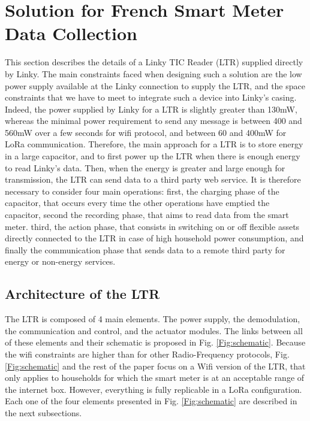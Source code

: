 \documentclass[conference]{IEEEtran}
\begin{document}
\section{Solution for French Smart Meter Data Collection}
\label{section:solution}
This section describes the details of a Linky TIC Reader (LTR) supplied directly by Linky. The main constraints faced when designing such a solution are the low power supply available at the Linky connection to supply the LTR, and the space constraints that we have to meet to integrate such a device into Linky's casing. Indeed, the power supplied by Linky for a LTR is slightly greater than 130mW, whereas the minimal power requirement to send any message is between 400 and 560mW over a few seconds for wifi protocol, and between 60 and 400mW for LoRa communication. Therefore, the main approach for a LTR is to store energy in a large capacitor, and to first power up the LTR when there is enough energy to read Linky's data. Then, when the energy is greater and large enough for transmission, the LTR can send data to a third party web service. It is therefore necessary to consider four main operations: first, the charging phase of the capacitor, that occurs every time the other operations have emptied the capacitor, second the recording phase, that aims to read data from the smart meter. third, the action phase, that consists in switching on or off flexible assets directly connected to the LTR in case of high household power consumption, and finally the communication phase that sends data to a remote third party for energy or non-energy services. 

\subsection{Architecture of the LTR}
The LTR is composed of 4 main elements. The power supply, the demodulation, the communication and control, and the actuator modules.   The links between all of these elements and their schematic is proposed in Fig. \ref{Fig:schematic}. Because the wifi constraints are higher than for other Radio-Frequency protocols, Fig. \ref{Fig:schematic} and the rest of the paper focus on a Wifi version of the LTR, that only applies to households for which the smart meter is at an acceptable range of the internet box. However, everything is fully replicable in a LoRa configuration. Each one of the four elements presented in Fig. \ref{Fig:schematic} are described in the next subsections.
\end{document}
